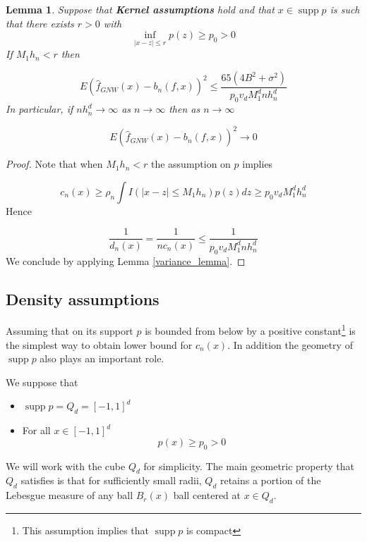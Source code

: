 \documentclass{article}
\newtheorem{lemma}[theorem]{Lemma}
\DeclareMathOperator\supp{supp}
\begin{document}
\begin{lemma}
\label{local_variance_lemma} Suppose that \textbf{Kernel assumptions} hold and that $x\in\supp{p}$ is such that there exists $r>0$ with
\begin{equation*}
    \inf_{|x-z|\leq r} p(z)\geq p_0>0
\end{equation*}
If $M_1h_n<r$ then

\begin{equation*}
    E(\hat{f}_{GNW}(x)-b_n(f,x))^2\leq \frac{65(4B^2+\sigma^2)}{p_0v_dM_1^dnh_n^d}
\end{equation*}
In particular, if $nh_n^d\to\infty$ as $n\to\infty$ then as $n\to\infty$


\begin{equation*}
E(\hat{f}_{GNW}(x)-b_n(f,x))^2\to 0    
\end{equation*}

\end{lemma}
\begin{proof}
Note that when $M_1h_n<r$ the assumption on $p$ implies

\begin{equation*}
c_n(x)\geq \rho_n\int I(|x-z|\leq M_1h_n)p(z)dz\geq p_0v_dM_1^dh_n^d
\end{equation*}
Hence

\begin{equation*}
    \frac{1}{d_n(x)}=\frac{1}{nc_n(x)}\leq \frac{1}{p_0v_dM_1^dnh_n^d}
\end{equation*}
We conclude by applying Lemma \ref{variance_lemma}.
\end{proof}
\subsection{Density assumptions}
Assuming that on its support $p$ is bounded from below by a positive constant\footnote{This assumption implies that $\supp{p}$ is compact} is the simplest way to obtain lower bound for $c_n(x)$. In addition the geometry of $\supp{p}$ also plays an important role.

We suppose that 
\begin{itemize}
    \item $\supp{p}=Q_d=[-1,1]^d$
    \item For all $x\in[-1,1]^d$ 
    \begin{equation*}
        p(x)\geq p_0>0
    \end{equation*}
\end{itemize}
We will work with the cube $Q_d$ for simplicity. The main geometric property that $Q_d$ satisfies is that for sufficiently small radii, $Q_d$ retains a portion of the Lebesgue measure of any ball $B_r(x)$ ball centered at $x\in Q_d$.
\end{document}
